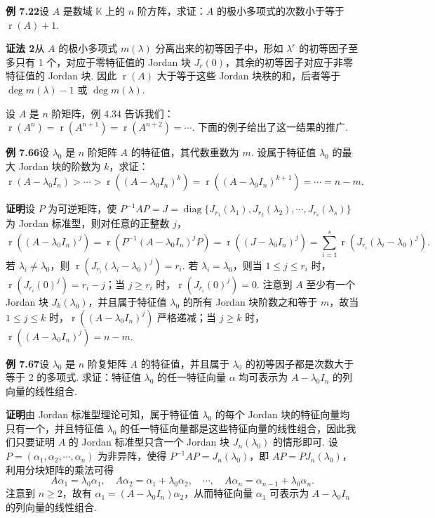 \documentclass[UTF8,12pt,a4paper,fontset=fandol]{ctexart}
\begin{document}
\noindent\textbf{例 7.22}\quad 设 $A$ 是数域 $\mathbb{K}$ 上的 $n$ 阶方阵，求证：$A$ 的极小多项式的次数小于等于 $\operatorname{r}(A)+1$.

\noindent\textbf{证法 2}\quad 从 $A$ 的极小多项式 $m(\lambda)$ 分离出来的初等因子中，形如 $\lambda^r$ 的初等因子至多只有 1 个，对应于零特征值的 Jordan 块 $J_r(0)$，其余的初等因子对应于非零特征值的 Jordan 块. 因此 $\operatorname{r}(A)$ 大于等于这些 Jordan 块秩的和，后者等于 $\deg m(\lambda)-1$ 或 $\deg m(\lambda)$.

设 $A$ 是 $n$ 阶矩阵，例 4.34 告诉我们：$\operatorname{r}(A^n)=\operatorname{r}(A^{n+1})=\operatorname{r}(A^{n+2})=\cdots$. 下面的例子给出了这一结果的推广.

\noindent\textbf{例 7.66}\quad 设 $\lambda_0$ 是 $n$ 阶矩阵 $A$ 的特征值，其代数重数为 $m$. 设属于特征值 $\lambda_0$ 的最大 Jordan 块的阶数为 $k$，求证：
\[
\operatorname{r}(A-\lambda_0I_n)>\cdots>\operatorname{r}((A-\lambda_0I_n)^k)=\operatorname{r}((A-\lambda_0I_n)^{k+1})=\cdots=n-m.
\]

\noindent\textbf{证明}\quad 设 $P$ 为可逆矩阵，使 $P^{-1}AP=J=\operatorname{diag}\{J_{r_1}(\lambda_1),J_{r_2}(\lambda_2),\cdots,J_{r_s}(\lambda_s)\}$ 为 Jordan 标准型，则对任意的正整数 $j$，
\[
\operatorname{r}((A-\lambda_0I_n)^j)=\operatorname{r}(P^{-1}(A-\lambda_0I_n)^jP)=\operatorname{r}((J-\lambda_0I_n)^j)=\sum_{i=1}^s\operatorname{r}(J_{r_i}(\lambda_i-\lambda_0)^j).
\]
若 $\lambda_i\ne\lambda_0$，则 $\operatorname{r}(J_{r_i}(\lambda_i-\lambda_0)^j)=r_i$. 若 $\lambda_i=\lambda_0$，则当 $1\le j\le r_i$ 时，$\operatorname{r}(J_{r_i}(0)^j)=r_i-j$；当 $j\ge r_i$ 时，$\operatorname{r}(J_{r_i}(0)^j)=0$. 注意到 $A$ 至少有一个 Jordan 块 $J_k(\lambda_0)$，并且属于特征值 $\lambda_0$ 的所有 Jordan 块阶数之和等于 $m$，故当 $1\le j\le k$ 时，$\operatorname{r}((A-\lambda_0I_n)^j)$ 严格递减；当 $j\ge k$ 时，$\operatorname{r}((A-\lambda_0I_n)^j)=n-m$.

\noindent\textbf{例 7.67}\quad 设 $\lambda_0$ 是 $n$ 阶复矩阵 $A$ 的特征值，并且属于 $\lambda_0$ 的初等因子都是次数大于等于 2 的多项式. 求证：特征值 $\lambda_0$ 的任一特征向量 $\alpha$ 均可表示为 $A-\lambda_0I_n$ 的列向量的线性组合.

\noindent\textbf{证明}\quad 由 Jordan 标准型理论可知，属于特征值 $\lambda_0$ 的每个 Jordan 块的特征向量均只有一个，并且特征值 $\lambda_0$ 的任一特征向量都是这些特征向量的线性组合，因此我们只要证明 $A$ 的 Jordan 标准型只含一个 Jordan 块 $J_n(\lambda_0)$ 的情形即可. 设 $P=(\alpha_1,\alpha_2,\cdots,\alpha_n)$ 为非异阵，使得 $P^{-1}AP=J_n(\lambda_0)$，即 $AP=PJ_n(\lambda_0)$，利用分块矩阵的乘法可得
\[
A\alpha_1=\lambda_0\alpha_1,\quad A\alpha_2=\alpha_1+\lambda_0\alpha_2,\quad \cdots,\quad A\alpha_n=\alpha_{n-1}+\lambda_0\alpha_n.
\]
注意到 $n\ge2$，故有 $\alpha_1=(A-\lambda_0I_n)\alpha_2$，从而特征向量 $\alpha_1$ 可表示为 $A-\lambda_0I_n$ 的列向量的线性组合.
\end{document}
